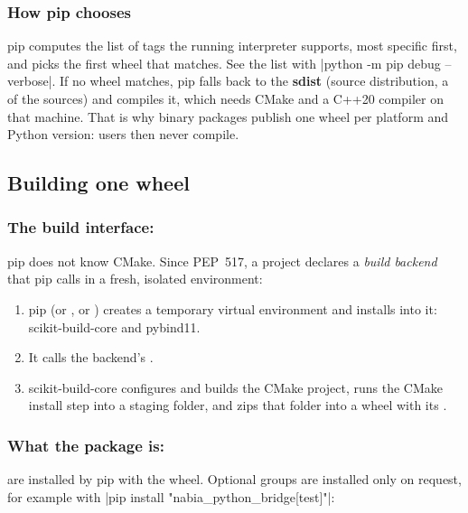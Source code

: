 \subsubsection{How pip chooses}
pip computes the list of tags the running interpreter supports, most specific first, and picks
the first wheel that matches. See the list with \cmd|python -m pip debug --verbose|. If no wheel
matches, pip falls back to the \textbf{sdist} (source distribution, a  of the
sources) and compiles it, which needs CMake and a C++20 compiler on that machine. That is why
binary packages publish one wheel per platform and Python version: users then never compile.

\subsection{Building one wheel}

\subsubsection{The build interface: \texorpdfstring{}{[build-system]}}
pip does not know CMake. Since PEP~517, a project declares a \emph{build backend} that pip calls
in a fresh, isolated environment:
\begin{enumerate}
  \item pip (or , or ) creates a temporary virtual environment
        and installs  into it: scikit-build-core and pybind11.
  \item It calls the backend's .
  \item scikit-build-core configures and builds the CMake project, runs the CMake install step into
        a staging folder, and zips that folder into a wheel with its .
\end{enumerate}

\subsubsection{What the package is: \texorpdfstring{\code{[project]}}{[project]}}
 are installed by pip with the wheel. Optional groups are installed only on
request, for example with \cmd|pip install "nabia_python_bridge[test]"|:

